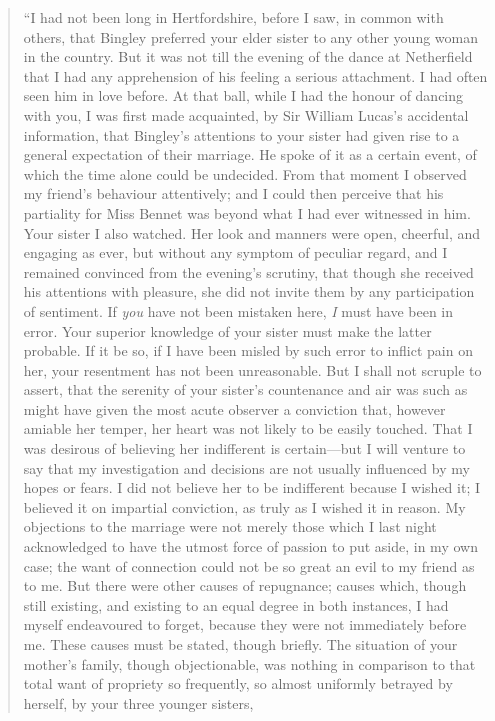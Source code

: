 \documentclass[12pt,english]{book}
\begin{document}
\begin{quotation}
{}``I had not been long in Hertfordshire, before I saw, in common
with others, that Bingley preferred your elder sister to any other
young woman in the country. But it was not till the evening of the
dance at Netherfield that I had any apprehension of his feeling a
serious attachment. I had often seen him in love before. At that ball,
while I had the honour of dancing with you, I was first made acquainted,
by Sir William Lucas's accidental information, that Bingley's attentions
to your sister had given rise to a general expectation of their marriage.
He spoke of it as a certain event, of which the time alone could be
undecided. From that moment I observed my friend's behaviour attentively;
and I could then perceive that his partiality for Miss Bennet was
beyond what I had ever witnessed in him. Your sister I also watched.
Her look and manners were open, cheerful, and engaging as ever, but
without any symptom of peculiar regard, and I remained convinced from
the evening's scrutiny, that though she received his attentions with
pleasure, she did not invite them by any participation of sentiment.
If \textit{you} have not been mistaken here, \textit{I} must have
been in error. Your superior knowledge of your sister must make the
latter probable. If it be so, if I have been misled by such error
to inflict pain on her, your resentment has not been unreasonable.
But I shall not scruple to assert, that the serenity of your sister's
countenance and air was such as might have given the most acute observer
a conviction that, however amiable her temper, her heart was not likely
to be easily touched. That I was desirous of believing her indifferent
is certain\mbox{---}but I will venture to say that my investigation
and decisions are not usually influenced by my hopes or fears. I did
not believe her to be indifferent because I wished it; I believed
it on impartial conviction, as truly as I wished it in reason. My
objections to the marriage were not merely those which I last night
acknowledged to have the utmost force of passion to put aside, in
my own case; the want of connection could not be so great an evil
to my friend as to me. But there were other causes of repugnance;
causes which, though still existing, and existing to an equal degree
in both instances, I had myself endeavoured to forget, because they
were not immediately before me. These causes must be stated, though
briefly. The situation of your mother's family, though objectionable,
was nothing in comparison to that total want of propriety so frequently,
so almost uniformly betrayed by herself, by your three younger sisters,

\end{quotation}
\end{document}
